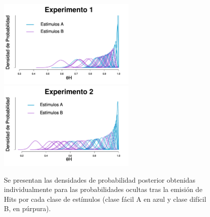 \begin{figure}[th]
\centering
\includegraphics[width=0.6\textwidth]{Figures/MTau_Hits_E1}\\
\includegraphics[width=0.6\textwidth]{Figures/MTau_Hits_E2}\\
\caption[Modelo Tau: Inferencias individuales acerca de las probabilidades ocultas tras la emisión de Hits por clase de estímulos; Experimentos 1 y 2]{Se presentan las densidades de probabilidad posterior obtenidas individualmente para las probabilidades ocultas tras la emisión de Hits por cada clase de estímulos (clase fácil A en azul y clase difícil B, en púrpura).}
\label{fig:Tau_Hits}
\end{figure}

